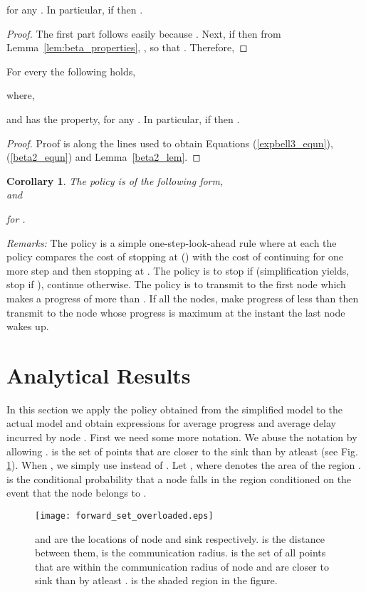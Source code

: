 \documentclass[onecolumn]{IEEEtran}
\newtheorem{corollary}[theorem]{Corollary}
\begin{document}
\begin{lemma}
\label{beta2_lem}
	 for any . In particular, if  then .
\end{lemma}
\begin{proof}
  The first part follows easily because 
  . 
  Next, if
   then from Lemma~\ref{lem:beta_properties}, 
  , so that . Therefore,
	
\end{proof}
\begin{lemma}
For every   the following holds,

where, 

and has the property,  for any . In particular,
if  then .
\end{lemma}
\begin{proof}
Proof is along the lines  used to obtain Equations (\ref{expbell3_equn}), (\ref{beta2_equn}) and Lemma~\ref{beta2_lem}.
\end{proof}
\vspace{2mm}
\begin{corollary}
The  policy  is of the following form,\\  and

for . 
\hfill 
\end{corollary}

\noindent
\emph{Remarks:} The policy is a simple one-step-look-ahead rule where
at each   the policy compares the cost of stopping
at  () with the cost of continuing for one more step
and then stopping at 
. The policy is to stop
if  (simplification yields, stop if ),
continue otherwise.  The policy is to transmit to the first node which
makes a progress of more than . If all the nodes, make
progress of less than  then transmit to the node whose
progress is maximum at the instant the last node wakes up.
\section{Analytical Results}
\label{analytical_results}
In this section we apply the policy  obtained from the
simplified model to the actual model and  obtain  expressions for 
average progress and average delay incurred by node .  First we need 
some more notation. We abuse the notation  by allowing 
 .  
is the set of points that are closer to  the sink than  by atleast  (see Fig. \ref{forwardsetoverloaded_figu}).  When , we simply use   instead of . Let , where  denotes the area of the region .  is the conditional probability that a node falls in the region  conditioned on the event that the node belongs to .
\begin{figure}[ht]
\centering
\texttt{[image: forward\_set\_overloaded.eps]}
\caption{ and  are the locations of node  and sink
  respectively.  is the distance between them,  is the
  communication radius.   is the set of all points that
  are within the communication radius of node  and are closer to sink
  than  by atleast .  is the shaded region in the figure.
  \label{forwardsetoverloaded_figu}}
\end{figure}
\end{document}
